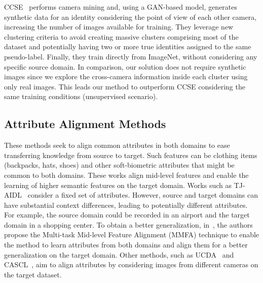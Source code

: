 \documentclass[journal]{IEEEtran}
\begin{document}
CCSE~\cite{lin2020unsupervisedccse}
performs camera mining and, using a GAN-based model, generates synthetic data for an identity considering the point of view of each other camera, increasing the number of images available for training. They leverage new clustering criteria to avoid creating massive clusters comprising most of the dataset and potentially having two or more true identities assigned to the same pseudo-label. 
Finally, they train directly from ImageNet, without considering any specific source domain.
In comparison, our solution does not require synthetic images since we explore the cross-camera information inside each cluster using only real images. This leads our method to outperform CCSE considering the same training conditions (unsupervised scenario). 



\subsection{Attribute Alignment Methods} 
These methods seek to align common attributes in both domains to ease transferring knowledge from source to target. Such features can be clothing items (backpacks, hats, shoes) and other soft-biometric attributes that might be common to both domains. These works align mid-level features and enable the learning of higher semantic features on the target domain. Works such as TJ-AIDL~\cite{wang2018transferable} consider a fixed set of attributes. However, source and target domains can have substantial context differences, leading to potentially different attributes. For example, the source domain could be recorded in an airport and the target domain in a shopping center. To obtain a better generalization, in~\cite{lin2018multi}, the authors propose the Multi-task Mid-level Feature Alignment (MMFA) technique to enable the method to learn attributes from both domains and align them for a better generalization on the target domain. Other methods, such as  UCDA~\cite{qi2019novel} and CASCL~\cite{wu2019unsupervised}, aim to align attributes by considering images from different cameras on the target dataset. 
\end{document}
